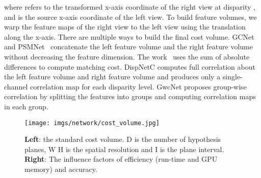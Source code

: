\documentclass[10pt,twocolumn,letterpaper]{article}
\begin{document}
where  refers to the transformed x-axis coordinate of the right view at disparity ,
and  is the source x-axis coordinate of the left view. To build feature volumes, we warp the feature maps of the right view to the left view using the translation along the x-axis.
There are multiple ways to build the final cost volume.
GCNet~\cite{kendall2017end} and PSMNet~\cite{chang2018pyramid} concatenate the left feature volume and the right feature volume without decreasing the feature dimension.
The work~\cite{zbontar2016stereo} uses the sum of absolute differences to compute matching cost. DispNetC \cite{mayer2016large} computes full correlation about the left feature volume and right feature volume and produces only a single-channel correlation map for each disparity level. 
GwcNet \cite{guo2019group} proposes group-wise correlation by splitting the features into groups and computing correlation maps in each group.

\begin{figure}[]
\begin{minipage}[t]{.3\linewidth}
\centering
\texttt{[image: imgs/network/cost\_volume.jpg]}
\end{minipage}
\hfill
\begin{minipage}[t]{.67\linewidth}
\vspace{-18mm}
\end{minipage}
\vspace{-3mm}
\caption{\textbf{Left}: the standard cost volume. D is the number of hypothesis planes, W  H is the spatial resolution and I is the plane interval. \textbf{Right}: The influence factors of efficiency (run-time and GPU memory) and accuracy.}
\vspace{-6mm}
\label{fig:efficiency_accuracy}
\end{figure}
\end{document}
